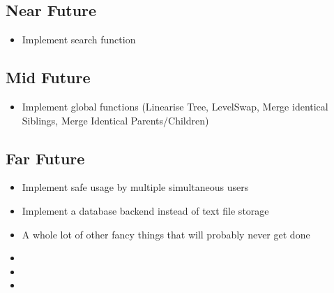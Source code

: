 \documentclass[letterpaper,10pt,english]{sphinxmanual}
\begin{document}
\subsection{Near Future}
\label{\detokenize{releases:near-future}}\begin{itemize}
\item {} 
\sphinxAtStartPar
Implement search function

\end{itemize}


\subsection{Mid Future}
\label{\detokenize{releases:mid-future}}\begin{itemize}
\item {} 
\sphinxAtStartPar
Implement global functions (Linearise Tree, Level\sphinxhyphen{}Swap, Merge identical Siblings, Merge Identical Parents/Children)

\end{itemize}


\subsection{Far Future}
\label{\detokenize{releases:far-future}}\begin{itemize}
\item {} 
\sphinxAtStartPar
Implement safe usage by multiple simultaneous users

\item {} 
\sphinxAtStartPar
Implement a database backend instead of text file storage

\item {} 
\sphinxAtStartPar
A whole lot of other fancy things that will probably never get done

\end{itemize}
\begin{itemize}
\item {} 
\sphinxAtStartPar
{}

\item {} 
\sphinxAtStartPar
{}

\item {} 
\sphinxAtStartPar
{}

\end{itemize}



\renewcommand{\indexname}{Index}
\printindex
\end{document}
